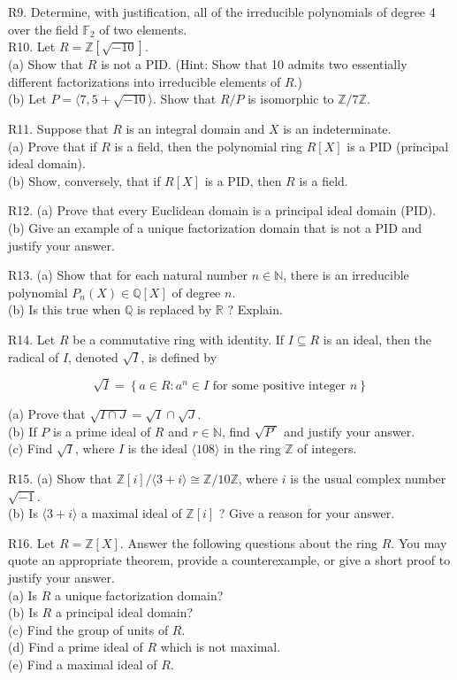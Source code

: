 R9. Determine, with justification, all of the irreducible polynomials of degree 4 over the field $\mathbb{F}_{2}$ of two elements.\\
R10. Let $R=\mathbb{Z}[\sqrt{-10}]$.\\
(a) Show that $R$ is not a PID. (Hint: Show that 10 admits two essentially different factorizations into irreducible elements of $R$.)\\
(b) Let $P=\langle 7,5+\sqrt{-10}\rangle$. Show that $R / P$ is isomorphic to $\mathbb{Z} / 7 \mathbb{Z}$.

R11. Suppose that $R$ is an integral domain and $X$ is an indeterminate.\\
(a) Prove that if $R$ is a field, then the polynomial ring $R[X]$ is a PID (principal ideal domain).\\
(b) Show, conversely, that if $R[X]$ is a PID, then $R$ is a field.

R12. (a) Prove that every Euclidean domain is a principal ideal domain (PID).\\
(b) Give an example of a unique factorization domain that is not a PID and justify your answer.

R13. (a) Show that for each natural number $n \in \mathbb{N}$, there is an irreducible polynomial $P_{n}(X) \in \mathbb{Q}[X]$ of degree $n$.\\
(b) Is this true when $\mathbb{Q}$ is replaced by $\mathbb{R}$ ? Explain.

R14. Let $R$ be a commutative ring with identity. If $I \subseteq R$ is an ideal, then the radical of $I$, denoted $\sqrt{I}$, is defined by

$$
\sqrt{I}=\left\{a \in R: a^{n} \in I \text { for some positive integer } n\right\}
$$

(a) Prove that $\sqrt{I \cap J}=\sqrt{I} \cap \sqrt{J}$.\\
(b) If $P$ is a prime ideal of $R$ and $r \in \mathbb{N}$, find $\sqrt{P^{r}}$ and justify your answer.\\
(c) Find $\sqrt{I}$, where $I$ is the ideal $\langle 108\rangle$ in the ring $\mathbb{Z}$ of integers.

R15. (a) Show that $\mathbb{Z}[i] /\langle 3+i\rangle \cong \mathbb{Z} / 10 \mathbb{Z}$, where $i$ is the usual complex number $\sqrt{-1}$.\\
(b) Is $\langle 3+i\rangle$ a maximal ideal of $\mathbb{Z}[i]$ ? Give a reason for your answer.

R16. Let $R=\mathbb{Z}[X]$. Answer the following questions about the ring $R$. You may quote an appropriate theorem, provide a counterexample, or give a short proof to justify your answer.\\
(a) Is $R$ a unique factorization domain?\\
(b) Is $R$ a principal ideal domain?\\
(c) Find the group of units of $R$.\\
(d) Find a prime ideal of $R$ which is not maximal.\\
(e) Find a maximal ideal of $R$.

